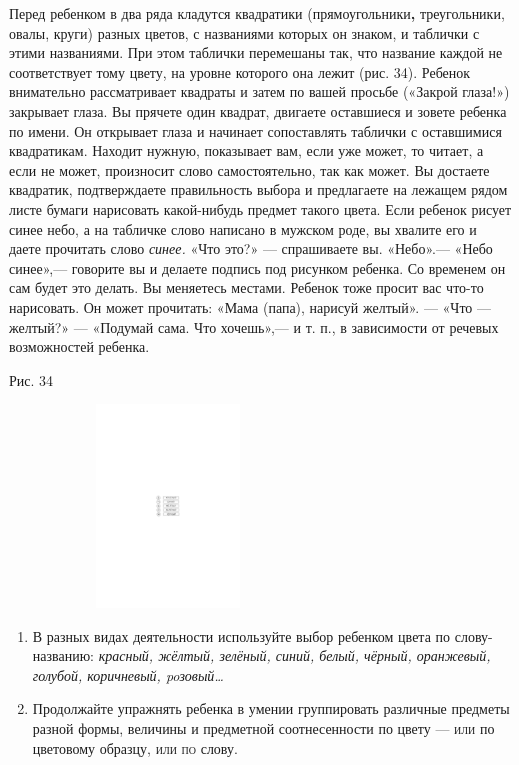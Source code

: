 \documentclass[a5paper]{book}
\renewcommand{\emph}[1]{\textit{#1}}
\begin{document}
Перед ребенком в два ряда кладутся квадратики (прямоугольники\textbf{,}
треугольники, овалы, круги) разных цветов, с названиями которых он
знаком, и таблички с этими названиями. При этом таблички перемешаны так,
что название каждой не соответствует тому цвету, на уровне которого она
лежит (рис. 34). Ребенок внимательно рассматривает квадраты и затем по
вашей просьбе («Закрой глаза!») закрывает глаза. Вы прячете один
квадрат, двигаете оставшиеся и зовете ребенка по имени. Он открывает
глаза и начинает сопоставлять таблички с оставшимися квадратикам.
Находит нужную, показывает вам, если уже может, то читает, а если не
может, произносит слово самостоятельно, так как может. Вы достаете
квадратик, подтверждаете правильность выбора и предлагаете на лежащем
рядом листе бумаги нарисовать какой-нибудь предмет такого цвета. Если
ребенок рисует синее небо, а на табличке слово написано в мужском роде,
вы хвалите его и даете прочитать слово \emph{синее.} «Что это?» ---
спрашиваете вы. «Небо».--- «Небо синее»,--- говорите вы и делаете
подпись под рисунком ребенка. Со временем он сам будет это делать. Вы
меняетесь местами. Ребенок тоже просит вас что-то нарисовать. Он может
прочитать: «Мама (папа), нарисуй желтый». --- «Что --- желтый?» ---
«Подумай сама. Что хочешь»,--- и т. п., в зависимости от речевых
возможностей ребенка.

Рис. 34
\begin{figure}
\centering
\includegraphics[width=2.4855in,height=2.12308in]{media/media/image31.png}
\end{figure}


\begin{enumerate}
\def\labelenumi{\arabic{enumi}.}
\setcounter{enumi}{1}
\item
  
  В разных видах деятельности используйте выбор ребенком цвета по
  слову-названию: \emph{красный, жёлтый, зелёный, синий, белый, чёрный,
  оранжевый, голубой, коричневый, poзовый\ldots{}}
  
\item
  
  Продолжайте упражнять ребенка в умении группировать различные предметы
  разной формы, величины и предметной соотнесенности по цвету ---
  \textsc{или} по цветовому образцу, \textsc{или по} слову.
  
\end{enumerate}
\end{document}
